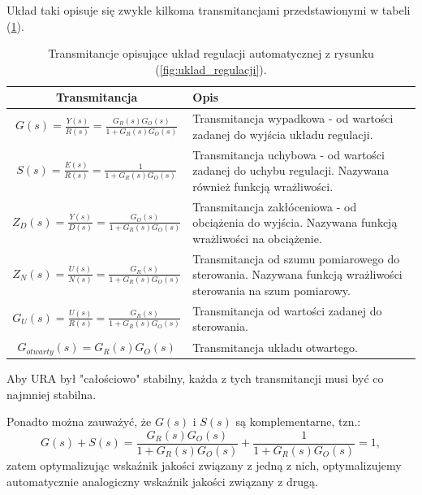 \documentclass{article}
\begin{document}
    Układ taki opisuje się zwykle kilkoma transmitancjami przedstawionymi w tabeli (\ref{tab:uklad_regulacji_transmitancje}).
    
    \begin{table}[H]
        \centering
        \begin{tabular}{|c|p{10cm}|}
            \hline
            \textbf{Transmitancja} & \textbf{Opis} \\
            \hline
            $G(s) = \frac{Y(s)}{R(s)} = \frac{G_{R}(s)G_{O}(s)}{1 + G_{R}(s)G_{O}(s)}$ & Transmitancja wypadkowa - od wartości zadanej do wyjścia układu regulacji.\\
            \hline
            $S(s) = \frac{E(s)}{R(s)} = \frac{1}{1 + G_{R}(s)G_{O}(s)}$ & Transmitancja uchybowa - od wartości zadanej do uchybu regulacji. Nazywana również funkcją wrażliwości.\\
            \hline
            $Z_{D}(s) = \frac{Y(s)}{D(s)} = \frac{G_{O}(s)}{1 + G_{R}(s)G_{O}(s)}$ & Transmitancja zakłóceniowa - od obciążenia do wyjścia. Nazywana funkcją wrażliwości na obciążenie.\\
            \hline
            $Z_{N}(s) = \frac{U(s)}{N(s)} = \frac{G_{R}(s)}{1 + G_{R}(s)G_{O}(s)}$ & Transmitancja od szumu pomiarowego do sterowania. Nazywana funkcją wrażliwości sterowania na szum pomiarowy.\\
            \hline
            $G_{U}(s) = \frac{U(s)}{R(s)} = \frac{G_{R}(s)}{1 + G_{R}(s)G_{O}(s)}$ & Transmitancja od wartości zadanej do sterowania.\\
            \hline
            $G_{otwarty}(s) = G_{R}(s)G_{O}(s)$ & Transmitancja układu otwartego.\\
            \hline
        \end{tabular}
        \caption{Transmitancje opisujące układ regulacji automatycznej z rysunku (\ref{fig:uklad_regulacji}).}
        \label{tab:uklad_regulacji_transmitancje}
    \end{table}

    Aby URA był "całościowo" stabilny, każda z tych transmitancji musi być co najmniej stabilna.

    Ponadto można zauważyć, że $G(s)$ i $S(s)$ są komplementarne, tzn.:
    $$
        G(s) + S(s) = \frac{G_{R}(s)G_{O}(s)}{1 + G_{R}(s)G_{O}(s)} + \frac{1}{1 + G_{R}(s)G_{O}(s)} = 1,
    $$
    zatem optymalizując wskaźnik jakości związany z jedną z nich, optymalizujemy automatycznie analogiczny wskaźnik jakości związany z drugą.
\end{document}
